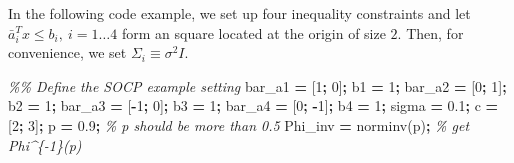 \documentclass[
]{book}
\newenvironment{Shaded}{\begin{snugshade}}{\end{snugshade}}
\newcommand{\CommentTok}[1]{\textcolor[rgb]{0.56,0.35,0.01}{\textit{#1}}}
\newcommand{\FloatTok}[1]{\textcolor[rgb]{0.00,0.00,0.81}{#1}}
\newcommand{\NormalTok}[1]{#1}
\newcommand{\OperatorTok}[1]{\textcolor[rgb]{0.81,0.36,0.00}{\textbf{#1}}}
\newcommand{\VariableTok}[1]{\textcolor[rgb]{0.00,0.00,0.00}{#1}}
\theoremstyle{definition}
\theoremstyle{definition}
\theoremstyle{definition}
\theoremstyle{definition}
\theoremstyle{remark}
\begin{document}
In the following code example, we set up four inequality constraints and let \(\bar{a}_i^T x \le b_i, \ i = 1 \dots 4\) form an square located at the origin of size \(2\). Then, for convenience, we set \(\Sigma_i \equiv \sigma^2 I\).

\begin{Shaded}
\begin{Highlighting}[]
\CommentTok{\%\% Define the SOCP example setting}
\VariableTok{bar\_a1} \OperatorTok{=}\NormalTok{ [}\FloatTok{1}\OperatorTok{;} \FloatTok{0}\NormalTok{]}\OperatorTok{;}
\VariableTok{b1} \OperatorTok{=} \FloatTok{1}\OperatorTok{;}
\VariableTok{bar\_a2} \OperatorTok{=}\NormalTok{ [}\FloatTok{0}\OperatorTok{;} \FloatTok{1}\NormalTok{]}\OperatorTok{;}
\VariableTok{b2} \OperatorTok{=} \FloatTok{1}\OperatorTok{;}
\VariableTok{bar\_a3} \OperatorTok{=}\NormalTok{ [}\OperatorTok{{-}}\FloatTok{1}\OperatorTok{;} \FloatTok{0}\NormalTok{]}\OperatorTok{;}
\VariableTok{b3} \OperatorTok{=} \FloatTok{1}\OperatorTok{;}
\VariableTok{bar\_a4} \OperatorTok{=}\NormalTok{ [}\FloatTok{0}\OperatorTok{;} \OperatorTok{{-}}\FloatTok{1}\NormalTok{]}\OperatorTok{;}
\VariableTok{b4} \OperatorTok{=} \FloatTok{1}\OperatorTok{;}
\VariableTok{sigma} \OperatorTok{=} \FloatTok{0.1}\OperatorTok{;} 
\VariableTok{c} \OperatorTok{=}\NormalTok{ [}\FloatTok{2}\OperatorTok{;} \FloatTok{3}\NormalTok{]}\OperatorTok{;}
\VariableTok{p} \OperatorTok{=} \FloatTok{0.9}\OperatorTok{;} \CommentTok{\% p should be more than 0.5}
\VariableTok{Phi\_inv} \OperatorTok{=} \VariableTok{norminv}\NormalTok{(}\VariableTok{p}\NormalTok{)}\OperatorTok{;} \CommentTok{\% get Phi\^{}\{{-}1\}(p)}


\end{Highlighting}
\end{Shaded}
\end{document}
